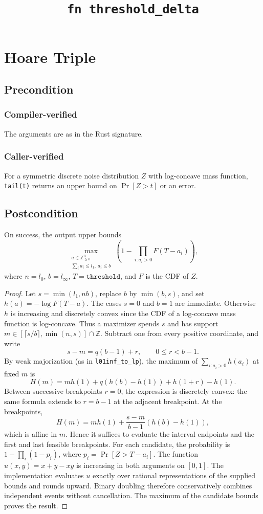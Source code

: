 \documentclass{article}
\title{\texttt{fn threshold\_delta}}
\author{\MichaelShoemateAuthor}
\begin{document}
\maketitle
\contrib

\section{Hoare Triple}
\subsection*{Precondition}
\subsubsection*{Compiler-verified}
The arguments are as in the Rust signature.
\subsubsection*{Caller-verified}
For a symmetric discrete noise distribution $Z$ with log-concave mass function,
\texttt{tail(t)} returns an upper bound on $\Pr[Z>t]$ or an error.

\subsection*{Postcondition}
\begin{theorem}
On success, the output upper bounds
\[
\max_{\substack{a\in\mathbb Z_{\ge0}^{n}\\
\sum_i a_i\le l_1,\ a_i\le b}}
\left(1-\prod_{i:a_i>0}F(T-a_i)\right),
\]
where $n=l_0$, $b=l_\infty$, $T=\texttt{threshold}$, and $F$ is the CDF of $Z$.
\end{theorem}

\begin{proof}
Let $s=\min(l_1,nb)$, replace $b$ by $\min(b,s)$, and set $h(a)=-\log F(T-a)$.
The cases $s=0$ and $b=1$ are immediate.
Otherwise $h$ is increasing and discretely convex since the CDF of a log-concave mass function is log-concave.
Thus a maximizer spends $s$ and has support $m\in[\lceil s/b\rceil,\min(n,s)]\cap\mathbb Z$.
Subtract one from every positive coordinate, and write
\[
s-m=q(b-1)+r,\qquad 0\le r<b-1.
\]
By weak majorization (as in \texttt{l01inf\_to\_lp}), the maximum of $\sum_{i:a_i>0}h(a_i)$ at fixed $m$ is
\[
H(m)=mh(1)+q(h(b)-h(1))+h(1+r)-h(1).
\]
Between successive breakpoints $r=0$, the expression is discretely convex:
the same formula extends to $r=b-1$ at the adjacent breakpoint.
At the breakpoints,
\[
H(m)=mh(1)+\frac{s-m}{b-1}(h(b)-h(1)),
\]
which is affine in $m$.
Hence it suffices to evaluate the interval endpoints and the first and last feasible breakpoints.
For each candidate, the probability is $1-\prod_i(1-p_i)$, where $p_i=\Pr[Z>T-a_i]$.
The function $u(x,y)=x+y-xy$ is increasing in both arguments on $[0,1]$.
The implementation evaluates $u$ exactly over rational representations of the supplied bounds and rounds upward.
Binary doubling therefore conservatively combines independent events without cancellation.
The maximum of the candidate bounds proves the result.
\end{proof}
\end{document}
